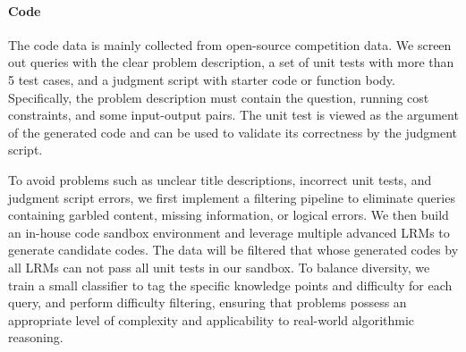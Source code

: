 



\noindent\paragraph{Code}
The code data is mainly collected from open-source competition data. 
We screen out queries with the clear problem description, a set of unit tests with more than 5 test cases, and a judgment script with starter code or function body.
Specifically, the problem description must contain the question, running cost constraints, and some input-output pairs.
The unit test is viewed as the argument of the generated code and can be used to validate its correctness by the judgment script.

To avoid problems such as unclear title descriptions, incorrect unit tests, and judgment script errors, 
we first implement a filtering pipeline to eliminate queries containing garbled content, missing information, or logical errors.
We then build an in-house code sandbox environment and leverage multiple advanced LRMs to generate candidate codes. The data will be filtered that whose generated codes by all LRMs can not pass all unit tests in our sandbox. 
To balance diversity, we train a small classifier to tag the specific knowledge points and difficulty for each query, and perform difficulty filtering, ensuring that problems possess an appropriate level of complexity and applicability to real-world algorithmic reasoning.



